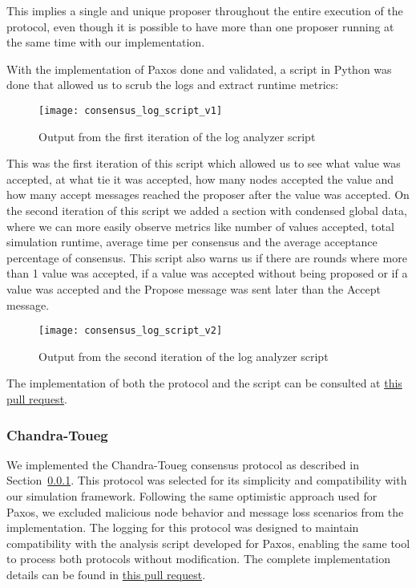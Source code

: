 This implies a single and unique proposer throughout the entire execution of the protocol, even though it is possible
to have more than one proposer running at the same time with our implementation.

With the implementation of Paxos done and validated, a script in Python was done that allowed us to
scrub the logs and extract runtime metrics:

\begin{figure}[h]
	\centering
	\texttt{[image: consensus\_log\_script\_v1]}
	\caption{Output from the first iteration of the log analyzer script}
	\label{fig:consensus_log_script_v1}
\end{figure}

This was the first iteration of this script which allowed us to see what value was accepted,
at what tie it was accepted, how many nodes accepted the value and how many accept messages
reached the proposer after the value was accepted. 
On the second iteration of this script we added a section with condensed global data, where we can more
easily observe metrics like number of values accepted, total simulation runtime, average time per consensus
and the average acceptance percentage of consensus.
This script also warns us if there are rounds where more than 1 value was accepted, if a value was
accepted without being proposed or if a value was accepted and the Propose message was sent later than the Accept message.

\begin{figure}[h]
	\centering
	\texttt{[image: consensus\_log\_script\_v2]}
	\caption{Output from the second iteration of the log analyzer script}
	\label{fig:consensus_log_script_v2}
\end{figure}

The implementation of both the protocol and
the script can be consulted at \href{https://github.com/RMLoureiro/MOBS/pull/2}{this pull request}.

\subsubsection{Chandra-Toueg}\label{sub:chandra-toueg}

We implemented the Chandra-Toueg consensus protocol as described in Section~\ref{sub:chandra-toueg}.
This protocol was selected for its simplicity and compatibility with our simulation framework.
Following the same optimistic approach used for Paxos, we excluded malicious node behavior and
message loss scenarios from the implementation. The logging for this protocol was designed to maintain
compatibility with the analysis script developed for Paxos, enabling the same tool to process
both protocols without modification. The complete implementation details can be found in
\href{https://github.com/RMLoureiro/MOBS/pull/4}{this pull request}.

